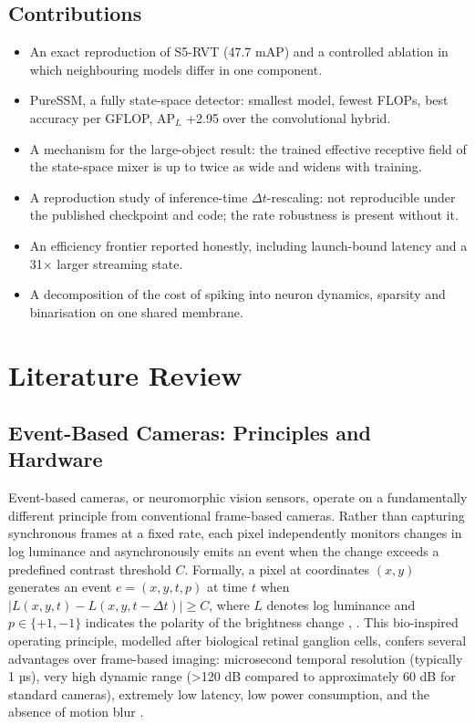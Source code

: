 \documentclass[11pt, a4paper]{report}
\newcommand{\Dt}{$\Delta t$}
\begin{document}
\section{Contributions}
\begin{itemize}
  \item An exact reproduction of S5-RVT (47.7 mAP) and a controlled ablation in which neighbouring models differ in one component.
  \item PureSSM, a fully state-space detector: smallest model, fewest FLOPs, best accuracy per GFLOP, $\mathrm{AP}_L$ +2.95 over the convolutional hybrid.
  \item A mechanism for the large-object result: the trained effective receptive field of the state-space mixer is up to twice as wide and widens with training.
  \item A reproduction study of inference-time \Dt{}-rescaling: not reproducible under the published checkpoint and code; the rate robustness is present without it.
  \item An efficiency frontier reported honestly, including launch-bound latency and a 31$\times$ larger streaming state.
  \item A decomposition of the cost of spiking into neuron dynamics, sparsity and binarisation on one shared membrane.
\end{itemize}

\chapter{Literature Review}
\label{ch:lit}

\section{Event-Based Cameras: Principles and Hardware}
Event-based cameras, or neuromorphic vision sensors, operate on a fundamentally different principle from conventional frame-based cameras. Rather than capturing synchronous frames at a fixed rate, each pixel independently monitors changes in log luminance and asynchronously emits an event when the change exceeds a predefined contrast threshold $C$. Formally, a pixel at coordinates $(x, y)$ generates an event $e = (x, y, t, p)$ at time $t$ when $|L(x, y, t) - L(x, y, t - \Delta t)| \geq C$, where $L$ denotes log luminance and $p \in \{+1, -1\}$ indicates the polarity of the brightness change \cite{gallego2020event}, \cite{lichtsteiner2008128x128}. This bio-inspired operating principle, modelled after biological retinal ganglion cells, confers several advantages over frame-based imaging: microsecond temporal resolution (typically 1 µs), very high dynamic range (>120 dB compared to approximately 60 dB for standard cameras), extremely low latency, low power consumption, and the absence of motion blur \cite{gallego2020event}.
\end{document}
